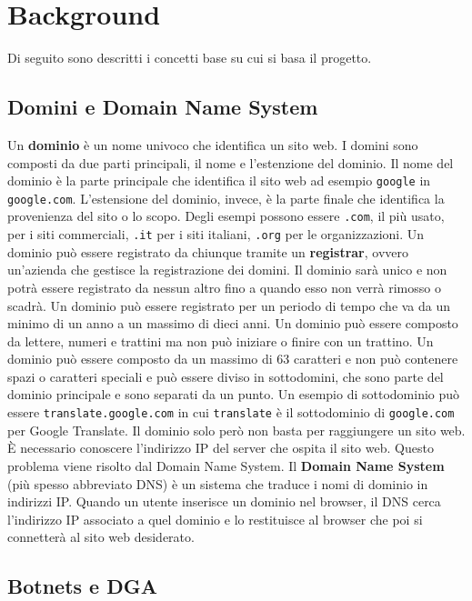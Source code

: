 \documentclass[12pt,a4paper,openright,twoside]{book}
\begin{document}

\chapter{Background}

Di seguito sono descritti i concetti base su cui si basa il progetto.

\section{Domini e Domain Name System}
Un \textbf{dominio} è un nome univoco che identifica un sito web.
I domini sono composti da due parti principali, il nome e l'estenzione del dominio.
Il nome del dominio è la parte principale che identifica il sito web
ad esempio \texttt{google} in \texttt{google.com}.
L'estensione del dominio, invece, è la parte finale
che identifica la provenienza del sito o lo scopo. Degli esempi possono essere
\texttt{.com}, il più usato, per i siti commerciali,
\texttt{.it} per i siti italiani, \texttt{.org} per le organizzazioni.
Un dominio può essere registrato da chiunque tramite
un \textbf{registrar}, ovvero
un'azienda che gestisce la registrazione dei domini.
Il dominio sarà unico e non potrà essere registrato da nessun altro
fino a quando esso non verrà rimosso o scadrà.
Un dominio può essere registrato per un periodo di tempo
che va da un minimo di un anno a un massimo di dieci anni.
Un dominio può essere composto da lettere, numeri e trattini
ma non può iniziare o finire con un trattino.
Un dominio può essere composto da un massimo di 63 caratteri
e non può contenere spazi o caratteri speciali e 
può essere diviso in sottodomini, che sono
parte del dominio principale e sono separati da un punto.
Un esempio di sottodominio può essere \texttt{translate.google.com} in cui
\texttt{translate} è il sottodominio di \texttt{google.com} per Google Translate.
Il dominio solo però non basta per raggiungere un sito web.
È necessario conoscere l'indirizzo IP
del server che ospita il sito web. 
Questo problema viene risolto dal Domain Name System. \hfill \break
Il \textbf{Domain Name System} (più spesso abbreviato DNS)
è un sistema che traduce i nomi di dominio in indirizzi IP.
Quando un utente inserisce un dominio nel browser, il DNS
cerca l'indirizzo IP associato a quel dominio
e lo restituisce al browser che poi si connetterà al sito web desiderato. \raggedbottom

\section{Botnets e DGA}
\end{document}
